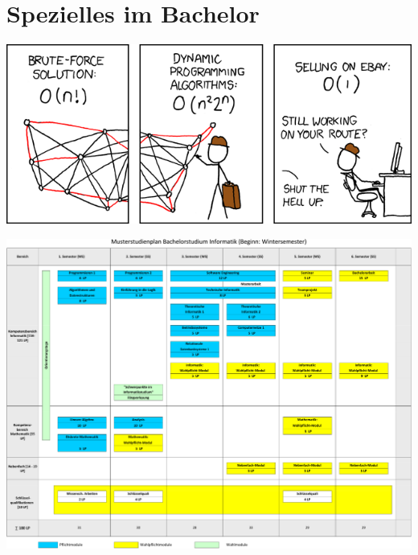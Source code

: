 \documentclass[]{papertex}
\begin{document}
	\section{Spezielles im Bachelor}
		\label{bachelor}
		\begin{multicols}{2}
		\end{multicols}
		\newpage
		\newpage
		\begin{multicols}{2}
		\end{multicols}
		\begin{center}
		\includegraphics[totalheight=6cm]{bilder/XKCD/travelling_salesman}
		\end{center}
		\begin{minipage}[H]{1.0\linewidth}
			\begin{center}     
			\label{musterstudienplan}
			\includegraphics[angle=90, totalheight=\textheight, width=\textwidth ]{bilder/studienplan_bsc_ws/muster_erste_ws-crop}
			\end{center}  
		\end{minipage}
\end{document}
